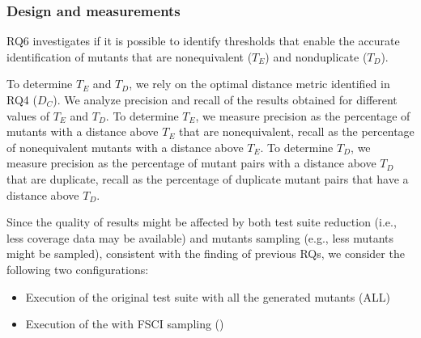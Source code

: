 \subsubsection{Design and measurements}
RQ6 investigates if it is possible to identify thresholds that enable the accurate identification of mutants that are nonequivalent ($T_E$) and nonduplicate ($T_D$).

To determine $T_E$ and $T_D$,
we rely on the optimal distance metric identified in RQ4 ($D_C$).
We analyze  precision and recall of the results obtained for  different values of $T_E$ and $T_D$.
To determine $T_E$, we measure
precision as the percentage of mutants with a distance above $T_E$ that are nonequivalent, recall as the percentage of nonequivalent mutants with a distance above $T_E$.
To determine $T_D$, we measure
precision as the percentage of mutant pairs with a distance above $T_D$ that are duplicate, recall as the percentage of duplicate mutant pairs that have a distance above $T_D$.

Since the quality of results might be affected by both test suite reduction (i.e., less coverage data may be available) and mutants sampling (e.g., less mutants might be sampled), consistent with the finding of previous RQs, we consider the following two configurations:
\begin{itemize}
\item Execution of the original test suite with all the generated mutants (ALL)
\item Execution of the \MPTS with FSCI sampling (\APPR)
\end{itemize}

